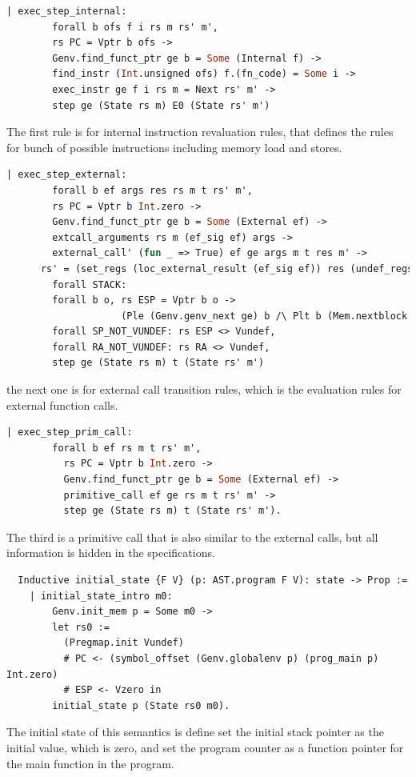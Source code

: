 \begin{lstlisting}[language=Caml]
    | exec_step_internal:
        forall b ofs f i rs m rs' m',
        rs PC = Vptr b ofs ->
        Genv.find_funct_ptr ge b = Some (Internal f) ->
        find_instr (Int.unsigned ofs) f.(fn_code) = Some i ->
        exec_instr ge f i rs m = Next rs' m' ->
        step ge (State rs m) E0 (State rs' m')
\end{lstlisting}
The first rule is for internal instruction revaluation rules, 
that defines the rules for bunch of possible instructions including 
memory load and stores. 
\begin{lstlisting}[language=Caml]
    | exec_step_external:
        forall b ef args res rs m t rs' m',
        rs PC = Vptr b Int.zero ->
        Genv.find_funct_ptr ge b = Some (External ef) ->
        extcall_arguments rs m (ef_sig ef) args ->
        external_call' (fun _ => True) ef ge args m t res m' ->
      rs' = (set_regs (loc_external_result (ef_sig ef)) res (undef_regs (CR ZF :: CR CF :: CR PF :: CR SF :: CR OF :: nil) (undef_regs (map preg_of destroyed_at_call) rs))) #PC <- (rs RA) #RA <- Vundef ->
        forall STACK:
        forall b o, rs ESP = Vptr b o ->
                    (Ple (Genv.genv_next ge) b /\ Plt b (Mem.nextblock m)),
        forall SP_NOT_VUNDEF: rs ESP <> Vundef,
        forall RA_NOT_VUNDEF: rs RA <> Vundef,
        step ge (State rs m) t (State rs' m')
\end{lstlisting}
the next one is for external call transition rules, which is
the evaluation rules for external function calls.
\begin{lstlisting}[language=Caml]
    | exec_step_prim_call:
        forall b ef rs m t rs' m',
          rs PC = Vptr b Int.zero ->
          Genv.find_funct_ptr ge b = Some (External ef) ->
          primitive_call ef ge rs m t rs' m' ->
          step ge (State rs m) t (State rs' m').
\end{lstlisting}
The third is a primitive call that is also similar to the external calls,
but all information is hidden in the specifications. 
\begin{lstlisting}
  Inductive initial_state {F V} (p: AST.program F V): state -> Prop :=
    | initial_state_intro m0:
        Genv.init_mem p = Some m0 ->
        let rs0 :=
          (Pregmap.init Vundef)
          # PC <- (symbol_offset (Genv.globalenv p) (prog_main p) Int.zero)
          # ESP <- Vzero in
        initial_state p (State rs0 m0).
\end{lstlisting}
The initial state of this semantics is define 
set the initial stack pointer as the initial value, which is zero,
and set the program counter as a function pointer for the main function in the program. 

